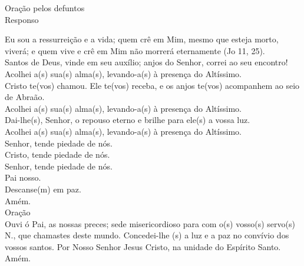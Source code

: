 \newpage
\begin{center}
    Oração pelos defuntos \\
    \hfill{} \break{}
    \textcolor{VioletRed3}{Responso}
\end{center}
\begin{flushleft}
    Eu sou a ressurreição e a vida; quem crê em Mim, mesmo que esteja morto, viverá; e quem vive e crê em Mim não morrerá eternamente (\textcolor{VioletRed3}{Jo 11, 25}).
    \vspace{.2cm} \\
    Santos de Deus, vinde em seu auxílio; anjos do Senhor, correi ao seu encontro! Acolhei a(s) sua(s) alma(s), levando-a(s) à presença do Altíssimo.
    \vspace{.2cm} \\
    \VbarRed{} Cristo te(vos) chamou. Ele te(vos) receba, e os anjos te(vos) acompanhem ao seio de Abraão. \\
    \RbarRed{} Acolhei a(s) sua(s) alma(s), levando-a(s) à presença do Altíssimo.
    \vspace{.2cm} \\
    \VbarRed{} Dai-lhe(s), Senhor, o repouso eterno e brilhe para ele(s) a vossa luz. \\
    \RbarRed{} Acolhei a(s) sua(s) alma(s), levando-a(s) à presença do Altíssimo.
    \vspace{.2cm} \\
    \VbarRed{} Senhor, tende piedade de nós. \\
    \RbarRed{} Cristo, tende piedade de nós. \\
    \VbarRed{} Senhor, tende piedade de nós.
    \vspace{.2cm} \\
    Pai nosso.
    \vspace{.2cm} \\
    \VbarRed{} Descanse(m) em paz. \\
    \RbarRed{} Amém.
    \vspace{.2cm} \\
    Oração
    \vspace{.2cm} \\
    Ouvi ó Pai, as nossas preces; sede misericordioso para com o(s) vosso(s) servo(s) \textcolor{VioletRed3}{N.}, que chamastes deste mundo. Concedei-lhe (s) a luz e a paz no convívio dos vossos santos. Por Nosso Senhor Jesus Cristo, na unidade do Espírito Santo. \\
    \RbarRed{} Amém.
    \vspace{.2cm} \\

\end{flushleft}
